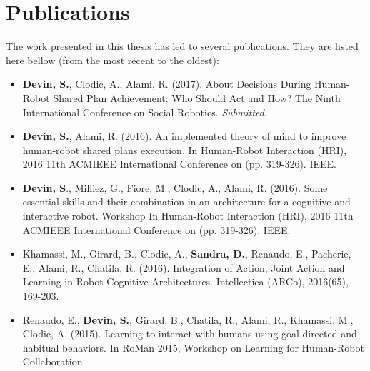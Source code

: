 \documentclass[english,a4paper,11pt,twoside]{StyleThese}
\begin{document}
\newpage
\section*{Publications}

The work presented in this thesis has led to several publications. They are listed here bellow (from the most recent to the oldest):
\begin{itemize}
\item \textbf{Devin, S.}, Clodic, A., Alami, R. (2017). About Decisions During Human-Robot Shared Plan Achievement: Who Should Act and How? The Ninth International Conference on Social Robotics. \textit{Submitted}.
\item \textbf{Devin, S.}, Alami, R. (2016). An implemented theory of mind to improve human-robot shared plans execution. In Human-Robot Interaction (HRI), 2016 11th ACM\/IEEE International Conference on (pp. 319-326). IEEE.
\item \textbf{Devin, S}., Milliez, G., Fiore, M., Clodic, A., Alami, R. (2016). Some essential skills and their combination in an architecture for a cognitive and interactive robot. Workshop In Human-Robot Interaction (HRI), 2016 11th ACM\/IEEE International Conference on (pp. 319-326). IEEE.
\item Khamassi, M., Girard, B., Clodic, A., \textbf{Sandra, D.}, Renaudo, E., Pacherie, E., Alami, R., Chatila, R. (2016). Integration of Action, Joint Action and Learning in Robot Cognitive Architectures. Intellectica (ARCo), 2016(65), 169-203.
\item Renaudo, E., \textbf{Devin, S.}, Girard, B., Chatila, R., Alami, R., Khamassi, M., Clodic, A. (2015). Learning to interact with humans using goal-directed and habitual behaviors. In RoMan 2015, Workshop on Learning for Human-Robot Collaboration.
\end{itemize}


\ifdefined{}
\else


\end{document}

